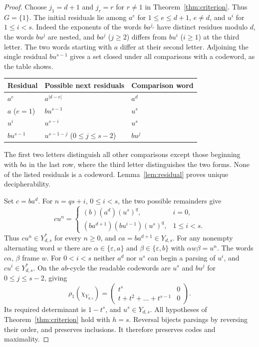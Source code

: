 \documentclass[11pt,a4paper]{article}
\newcommand{\eps}{\varepsilon}
\begin{document}
\begin{proof}
Choose $j_1=d+1$ and $j_r=r$ for $r\ne1$ in Theorem~\ref{thm:criterion}. Thus $G=\{1\}$. The
initial residuals lie among $a^e$ for $1\le e\le d+1$, $e\ne d$, and $u^i$ for $1\le i<s$. Indeed
the exponents of the words $ba^{j_r}$ have distinct residues modulo $d$, the words $bu^j$ are
nested, and $ba^j$ ($j\ge2$) differs from $bu^i$ ($i\ge1$) at the third letter. The two words
starting with $a$ differ at their second letter. Adjoining the single residual $bu^{s-1}$ gives a
set closed under all comparisons with a codeword, as the table shows.
\begin{center}
\begin{tabular}{lll}
Residual & Possible next residuals & Comparison word\\\hline
$a^e$ & $a^{|d-e|}$ & $a^d$\\
$a$ ($e=1$) & $bu^{s-1}$ & $u^s$\\
$u^i$ & $u^{s-i}$ & $u^s$\\
$bu^{s-1}$ & $u^{s-1-j}$ ($0\le j\le s-2$) & $bu^j$
\end{tabular}
\end{center}
The first two letters distinguish all other comparisons except those beginning with $ba$ in the
last row, where the third letter distinguishes the two forms. None of the listed residuals is a
codeword. Lemma~\ref{lem:residual} proves unique decipherability.

Set $c=ba^d$. For $n=qs+i$, $0\le i<s$, the two possible remainders give
\[
  cu^n=\begin{cases}(b)(a^d)(u^s)^q,& i=0,\\ (ba^{d+1})(bu^{i-1})(u^s)^q,& 1\le i<s.\end{cases}
\]
Thus $cu^n\in Y_{d,s}^*$ for every $n\ge0$, and $ca=ba^{d+1}\in Y_{d,s}$. For any nonempty
alternating word $w$ there are $\alpha\in\{\eps,a\}$ and $\beta\in\{\eps,b\}$ with $\alpha
w\beta=u^n$. The words $c\alpha$, $\beta$ frame $w$. For $0<i<s$ neither $a^d$ nor $u^s$ can begin
a parsing of $u^i$, and $cu^i\in Y_{d,s}^*$. On the $ab$-cycle the readable codewords are $u^s$
and $bu^j$ for $0\le j\le s-2$, giving
\[
  \rho_1(\chi_{Y_{d,s}})=\begin{pmatrix}t^s&0\\t+t^2+\dots+t^{s-1}&0\end{pmatrix}.
\]
Its required determinant is $1-t^s$, and $u^s\in Y_{d,s}$. All hypotheses of
Theorem~\ref{thm:criterion} hold with $h=s$. Reversal bijects parsings by reversing their order,
and preserves inclusions. It therefore preserves codes and maximality.
\end{proof}
\end{document}

